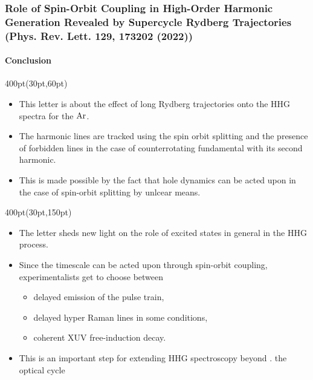 \begin{frame}
\frametitle{
Role of Spin-Orbit Coupling in High-Order Harmonic Generation
Revealed by Supercycle Rydberg Trajectories
\footnotesize (Phys. Rev. Lett. 129, 173202 (2022))
}
	\framesubtitle{Conclusion}
\small
\footnotesize
\begin{textblock*}{400pt}(30pt,60pt)
\begin{itemize}
\item This letter is about the effect of long Rydberg trajectories
onto the HHG spectra for the $\rm Ar$.
\item The harmonic lines are tracked using the spin orbit splitting
and the presence of forbidden lines in the case of counterrotating fundamental
with its second harmonic.
\item This is made possible by the fact that hole dynamics 
can be acted upon in the case of spin-orbit splitting by unlcear means.
\end{itemize}
\end{textblock*}


\begin{textblock*}{400pt}(30pt,150pt)
\begin{itemize}
\item The letter sheds new light on the role of excited states 
in general in the HHG process.
\item Since the timescale can be acted upon through spin-orbit coupling,
experimentalists get to choose between 
\begin{itemize}
\footnotesize
\item[$\bullet$] delayed emission of the pulse train,
\item[$\bullet$] delayed hyper Raman lines in some conditions,
\item[$\bullet$] coherent XUV free-induction decay.
\end{itemize}
\item This is an important step for extending HHG spectroscopy beyond .
the optical cycle 
\end{itemize}
\end{textblock*}




\end{frame}
